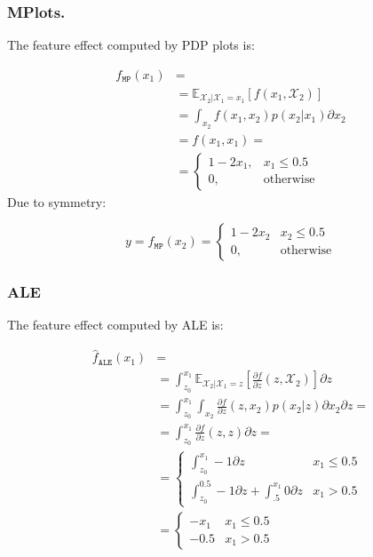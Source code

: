 \documentclass[runningheads, envcountsame, a4paper]{llncs}
\newcommand{\E}{\mathbb{E}}
\begin{document}
\subsubsection*{MPlots.}

The feature effect computed by PDP plots is:

\begin{equation}
  \label{eq:example-1-MPlots}
  \begin{split}
    f_{\mathtt{MP}}(x_1) &= \\
    & = \mathbb{\E}_{\mathcal{X}_2|\mathcal{X}_1=x_1}[f(x_1,\mathcal{X}_2)] \\
    & = \int_{x_2} f(x_1,x_2) p(x_2|x_1) \partial x_2 \\
    & =   f(x_1, x_1) = \\
  & = \begin{cases}
    1 - 2x_1, & x_1 \leq 0.5 \\
    0, & \text{otherwise}
\end{cases}
  \end{split}
\end{equation}
%
Due to symmetry:

\begin{equation}
  y = f_{\mathtt{MP}}(x_2) =
  \begin{cases}
    1 - 2x_2 & x_2 \leq 0.5 \\
    0, &\text{otherwise}
  \end{cases}
\end{equation}

\subsubsection*{ALE}

The feature effect computed by ALE is:

\begin{equation}
  \label{eq:example-1-ale}
  \begin{split}
    \hat{f}_{\mathtt{ALE}}(x_1) &= \\
    & = \int_{z_0}^{x_1} \mathbb{E}_{\mathcal{X}_2|\mathcal{X}_1=z} \left [\frac{\partial f}{\partial z}(z, \mathcal{X}_2) \right ] \partial z \\
    & = \int_{z_0}^{x_1} \int_{x_2} \frac{\partial f}{\partial z}(z,x_2) p(x_2|z)  \partial x_2 \partial z = \\
    & = \int_{z_0}^{x_1} \frac{\partial f}{\partial z}(z,z) \partial z = \\
    & = \begin{cases}
      \int_{z_0}^{x_1} -1 \partial z & x_1 \leq 0.5 \\
      \int_{z_0}^{0.5} -1 \partial z + \int_{.5}^{x_1} 0 \partial z & x_1 > 0.5
    \end{cases} \\
    & = \begin{cases}
      -x_1 & x_1 \leq 0.5 \\
      -0.5 & x_1 > 0.5
    \end{cases}
  \end{split}
\end{equation}
\end{document}
